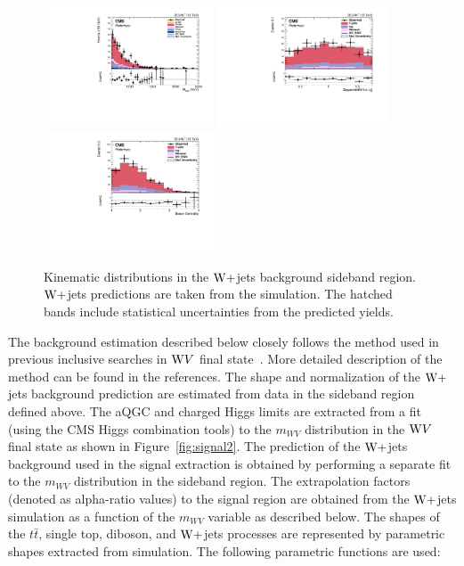 \begin{figure}[!htbp]
\includegraphics[width=0.45\textwidth]{Plots/plots/DibosonBoostedElMuCuts13TeV_WjetControlRegion_Tighter_CHS_mass_lvj_type0_PuppiAK8.pdf}
\includegraphics[width=0.45\textwidth]{Plots/plots/DibosonBoostedElMuCuts13TeV_WjetControlRegion_Tighter_CHS_ZeppenfeldWH_new.pdf}
\includegraphics[width=0.45\textwidth]{Plots/plots/DibosonBoostedElMuCuts13TeV_WjetControlRegion_Tighter_CHS_BosonCentrality_type0.pdf}
\caption{Kinematic distributions in the $\mathrm{W}+$jets background sideband region. $\mathrm{W}+$jets predictions are taken from the simulation. The hatched bands include statistical uncertainties from the predicted yields.}
\label{fig:wjet_control2}
\end{figure}

The background estimation described below closely follows the method used in previous inclusive searches in $\mathrm{W} V$ final state~\cite{VV_resonance_2016,WVaTGC2016}. More detailed description of the method can be found in the references. The shape and normalization of the $\mathrm{W}+$jets background prediction are estimated from data in the sideband region defined above. The aQGC and charged Higgs limits are extracted from a fit (using the CMS Higgs combination tools) to the $m_{WV}$ distribution in the $\mathrm{W} V$ final state as shown in Figure~\ref{fig:signal2}. The prediction of the $\mathrm{W}+$jets background used in the signal extraction is obtained by performing a separate fit to the $m_{WV}$ distribution in the sideband region. The extrapolation factors (denoted as alpha-ratio values) to the signal region are obtained from the $\mathrm{W}+$jets simulation as a function of the $m_{WV}$ variable as described below. The shapes of the $t\bar{t}$, single top, diboson, and $\mathrm{W}+$jets processes are represented by parametric shapes extracted from simulation. The following parametric functions are used: 

